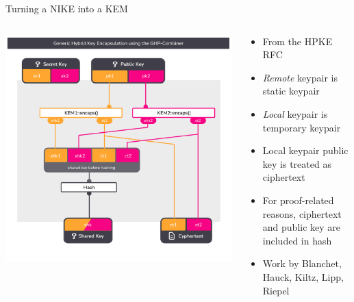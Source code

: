 \begin{frame}{Turning a NIKE into a KEM}
  \begin{columns}[c]
    \begin{column}{.6\linewidth}
      \includegraphics[height=.92\textheight,page=2,clip=true,trim={0.5cm 1cm 0.7cm 1.5cm}]{graphics/rosenpass-encapsulation-combiner.pdf}
    \end{column}

    \begin{column}{.4\linewidth}
      \small
      \begin{itemize}
        \item From the HPKE RFC \citeHpke
        \item \emph{Remote} keypair is static keypair
        \item \emph{Local} keypair is temporary keypair
        \item Local keypair public key is treated as ciphertext
        \item For proof-related reasons, ciphertext and public key
          are included in hash
        \item Work by Blanchet, Hauck, Kiltz, Lipp, Riepel
      \end{itemize}
    \end{column}
  \end{columns}
\end{frame}

